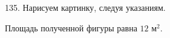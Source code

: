 135. Нарисуем картинку, следуя указаниям.
\begin{center}
\begin{figure}[ht!]
\end{figure}
\end{center}
Площадь полученной фигуры равна $12\text{ м}^2.$
\newpage\noindent
